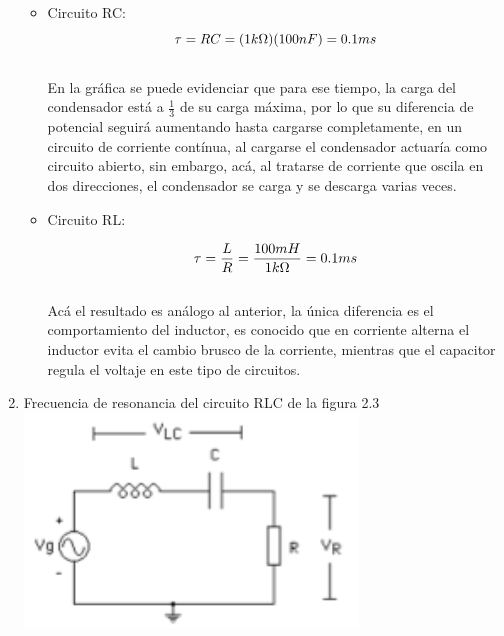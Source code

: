 \documentclass[12pt]{article}
\begin{document}
\begin{enumerate}
		\begin{itemize}
			\item Circuito RC:\\
			
			\begin{equation}
				\notag \tau = RC = (1k\Omega)(100nF) = 0.1ms
			\end{equation}\\
		
			\noindent En la gráfica se puede evidenciar que para ese tiempo, la carga del condensador está a $\frac{1}{3}$ de su carga máxima, por lo que su diferencia de potencial seguirá aumentando hasta cargarse completamente, en un circuito de corriente contínua, al cargarse el condensador actuaría como circuito abierto, sin embargo, acá, al tratarse de corriente que oscila en dos direcciones, el condensador se carga y se descarga varias veces.\\
			
			\item Circuito RL:
			
			\begin{equation}
				\notag \tau = \frac{L}{R} = \frac{100mH}{1k\Omega} = 0.1ms
			\end{equation}\\
			
			\noindent Acá el resultado es análogo al anterior, la única diferencia es el comportamiento del inductor, es conocido que en corriente alterna el inductor evita el cambio brusco de la corriente, mientras que el capacitor regula el voltaje en este tipo de circuitos.\\
			
		\end{itemize}
		
		\item Frecuencia de resonancia del circuito RLC de la figura 2.3\\
		
		\includegraphics{Img/2_3}\\
		

\end{enumerate}
\end{document}
